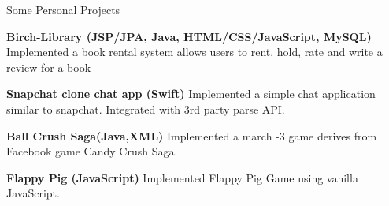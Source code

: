 \documentclass{resume} %
\begin{document}
\begin{rSection}{Some Personal Projects}

\item {\bf Birch-Library (JSP/JPA, Java, HTML/CSS/JavaScript, MySQL)} Implemented a book rental system allows users to rent, hold, rate and write a review for a book




\item {\bf Snapchat clone chat app (Swift)} Implemented a simple chat application similar to snapchat. Integrated with 3rd party parse API.



\item {\bf Ball Crush Saga(Java,XML)} Implemented a march -3 game derives from Facebook game Candy Crush Saga.





\item {\bf Flappy Pig (JavaScript)} Implemented Flappy Pig Game using vanilla JavaScript.

\end{rSection}





\end{document}

